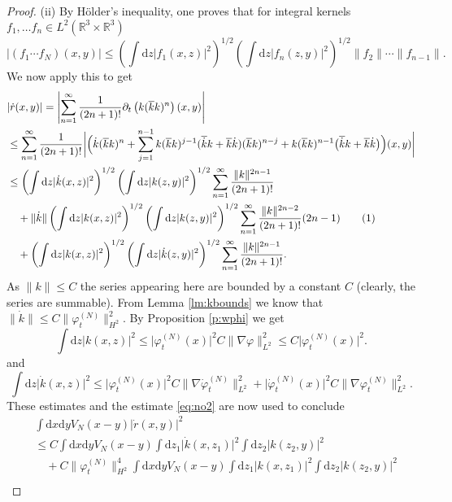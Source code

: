 \documentclass[11pt,a4paper,DIV11]{scrartcl}	%
\newcommand{\di}{\textrm{d}}		%
\newcommand{\cc}[1]{\overline{#1}}	%
\newcommand{\Rbb}{\mathbb{R}}		%
\newcommand{\norm}[1]{\lVert#1\rVert}	%
\newcommand{\ph}{\varphi_t^{(N)}}	%
\newcommand{\phdot}{\dot{\varphi}_t^{(N)}}	%
\newcommand{\bd}{\begin{displaymath}}			%
\newcommand{\ed}{\end{displaymath}}
\newcommand{\tagg}[1]{ \stepcounter{equation} \tag{\theequation} \label{eq:#1} } %
\newcommand{\eqr}[1]{\eqref{eq:#1}}			%
\begin{document}
\begin{proof}
(ii) By H\"older's inequality, one proves that for integral kernels $f_1, \dots f_n \in L^2(\Rbb^3\times\Rbb^3)$
\[
\lvert (f_1 \cdots f_N)(x,y)\rvert \leq \left( \int \di z \lvert f_1(x,z)\rvert^2 \right)^{1/2} \left( \int \di z \lvert f_n(z,y)\rvert^2\right)^{1/2} \norm{f_2} \cdots \norm{f_{n-1}}.
\]
We now apply this to get
\begin{align*}
& \lvert \dot r(x,y) \rvert = \left\lvert \sum_{n=1}^\infty \frac{1}{(2n+1)!} \partial_t \left(k(\cc k k)^n \right)(x,y)\right\rvert \\
& \leq \sum_{n=1}^\infty \frac{1}{(2n+1)!}
 \bigg\lvert\Big( \dot k(\cc k k)^n + \sum_{j=1}^{n-1} k(\cc k k)^{j-1}(\cc{\dot k}k + \cc k \dot k)(\cc k k)^{n-j} + k (\cc k k)^{n-1} \big( \cc{\dot k} k + \cc{k}\dot k\big) \Big)(x,y)\bigg\rvert \\
& \leq \left(\int \di z \lvert \dot k(x,z)\rvert^2 \right)^{1/2} \left( \int \di z \lvert k(z,y)\rvert^2 \right)^{1/2} \sum_{n=1}^\infty \frac{\norm{k}^{2n-1}}{(2n+1)!} \\
& \quad + \norm{\dot k} \left( \int \di z \lvert k(x,z)\rvert^2 \right)^{1/2} \left( \int \di z \lvert k(z,y)\rvert^2 \right)^{1/2} \sum_{n=1}^\infty \frac{\norm{k}^{2n-2}}{(2n+1)!} (2n-1) \tagg{no2}\\
& \quad + \left( \int \di z \lvert k(x,z)\rvert^2 \right)^{1/2} \left( \int \di z \lvert \dot k(z,y)\rvert^2 \right)^{1/2} \sum_{n=1}^\infty \frac{\norm{k}^{2n-1}}{(2n+1)!}.
\end{align*}
As $\norm{k} \leq C$ the series appearing here are bounded by a constant $C$ (clearly, the series are summable). From Lemma \ref{lm:kbounds} we know that $\norm{\dot k} \leq C \norm{\ph}_{H^2}^2$. By Proposition \ref{p:wphi} we get
\bd
\int \di z \lvert k(x,z)\rvert^2 \leq \lvert \ph(x)\rvert^2 C \norm{\nabla \varphi}_{L^2}^2 \leq C \lvert \ph(x)\rvert^2.
\ed
and
\bd
\int \di z \lvert \dot k(x,z)\rvert^2 \leq \lvert \ph(x)\rvert^2 C \norm{\nabla \phdot}_{L^2}^2 + \lvert \phdot(x)\rvert^2 C \norm{\nabla \ph}_{L^2}^2.
\ed
These estimates and the estimate \eqr{no2} are now used to conclude
\begin{align*}
& \int \di x \di y V_N(x-y) \lvert \dot r(x,y)\rvert^2 \\
& \leq C \int \di x \di y V_N(x-y) \int \di z_1 \lvert \dot k(x,z_1)\rvert^2 \int \di z_2 \lvert k(z_2,y)\rvert^2 \\
& \quad + C \norm{\ph}_{H^2}^4 \int \di x \di y V_N(x-y) \int \di z_1 \lvert k(x,z_1)\rvert^2 \int \di z_2 \lvert k(z_2,y)\rvert^2 \\

\end{align*}
\end{proof}
\end{document}

